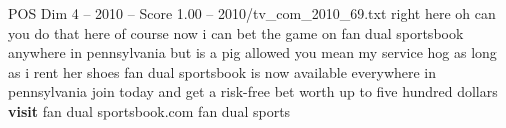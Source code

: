 \begin{textsample}{POS Dim 4 – 2010 – Score 1.00 – 2010/tv\_com\_2010\_69.txt}  \label{ex:f4_pos_057}
right here oh can you do that here of course now i can bet the game on fan dual sportsbook anywhere in pennsylvania but is a pig allowed you mean my service hog as long as i rent her shoes fan dual sportsbook is now available everywhere in pennsylvania join today and get a risk-free bet worth up to five hundred dollars \textbf{visit} fan dual sportsbook.com fan dual sports

\end{textsample}
